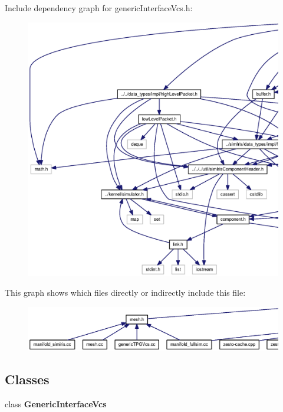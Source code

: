 Include dependency graph for genericInterfaceVcs.h:\nopagebreak
\begin{figure}[H]
\begin{center}
\leavevmode
\includegraphics[width=420pt]{genericInterfaceVcs_8h__incl}
\end{center}
\end{figure}


This graph shows which files directly or indirectly include this file:\nopagebreak
\begin{figure}[H]
\begin{center}
\leavevmode
\includegraphics[width=420pt]{genericInterfaceVcs_8h__dep__incl}
\end{center}
\end{figure}
\subsection*{Classes}
\begin{CompactItemize}
\item 
class {\bf GenericInterfaceVcs}
\end{CompactItemize}
